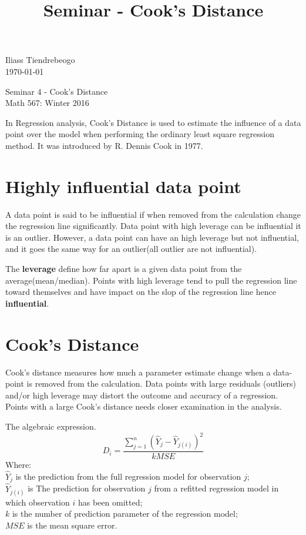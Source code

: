 \documentclass{article}[20pt]
\begin{document}
\begin{center}


\title{Seminar - Cook's Distance }
\hfill Iliass Tiendrebeogo\\

\hfill \today\\
\end{center}
\bigskip

\begin{center}
  \begin{Large}
      
    Seminar 4 - Cook's Distance \\
    Math 567: Winter 2016 \\
       
  \end{Large}
\end{center}

\bigskip

In Regression analysis, Cook's Distance is used to estimate the influence of a data point over the model when performing the ordinary least square regression method. It was introduced by R. Dennis Cook in 1977. \citep{cook} 
\section{Highly influential  data point}
A data point is said to be influential if when removed from the calculation change the regression line significantly. Data point with high leverage can be influential it is an outlier. However, a data point can have an high leverage but not influential, and it goes the same way for an outlier(all outlier are not influential).

The {\bf leverage} define how far apart is a given data point from the average(mean/median). Points with high leverage tend to pull the regression line toward themselves and have impact on the slop of the regression line hence {\bf influential}.
\section{Cook's Distance}
Cook's distance measures how much a parameter estimate change when a data-point is removed from the calculation. Data points with large residuals (outliers) and/or high leverage may distort the outcome and accuracy of a regression. Points with a large Cook's distance needs closer examination in the analysis.

\bigskip
The algebraic expression.
$$D_i = \frac{\sum_{j=1}^n \left( \hat{Y}_j - \hat{Y}_{j(i)}  \right) ^2}{k MSE}$$
Where:\\
$\hat{Y}_j$ is the prediction from the full regression model for observation $j$; \\
$\hat{Y}_{j(i)}$ is The prediction for observation $j$ from a refitted regression model in which observation $i$ has been omitted;\\
$k$ is the number of prediction parameter of the regression model;\\
$MSE$ is the mean square error.\\
\end{document}
